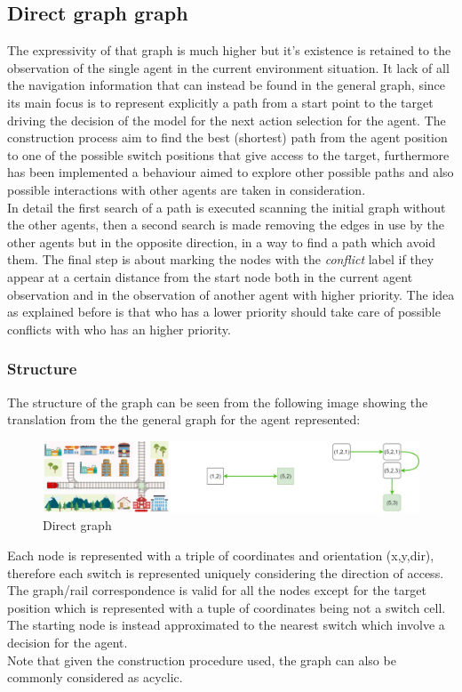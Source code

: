 \subsection{Direct graph graph}
The expressivity of that graph is much higher but it's existence is retained to the observation of the single agent in the current environment situation. It lack of all the navigation information that can instead be found in the general graph, since its main focus is to represent explicitly a path from a start point to the target driving the decision of the model for the next action selection for the agent. The construction process aim to find the best (shortest) path from the agent position to one of the possible switch positions that give access to the target, furthermore has been implemented a behaviour aimed to explore other possible paths and also possible interactions with other agents are taken in consideration.\\
In detail the first search of a path is executed scanning the initial graph without the other agents, then a second search is made removing the edges in use by the other agents but in the opposite direction, in a way to find a path which avoid them. The final step is about marking the nodes with the \textit{conflict} label if they appear at a certain distance from the start node both in the current agent observation and in the observation of another agent with higher priority.
The idea as explained before is that who has a lower priority should take care of possible conflicts with who has an higher priority.

\subsubsection{Structure}
The structure of the graph can be seen from the following image showing the translation from the the general graph for the agent represented:

\begin{figure}[H]
\begin{adjustwidth}{-1cm}{}
\includegraphics[scale=0.35]{figures/direct-graph.jpg}
\caption{Direct graph}
\end{adjustwidth}
\end{figure}
Each node is represented with a triple of coordinates and orientation (x,y,dir), therefore each switch is represented uniquely considering the direction of access. The graph/rail correspondence is valid for all the nodes except for the target position which is represented with a tuple of coordinates being not a switch cell. The starting node is instead approximated to the nearest switch which involve a decision for the agent.\\\noindent
Note that given the construction procedure used, the graph can also be commonly considered as acyclic.\\

